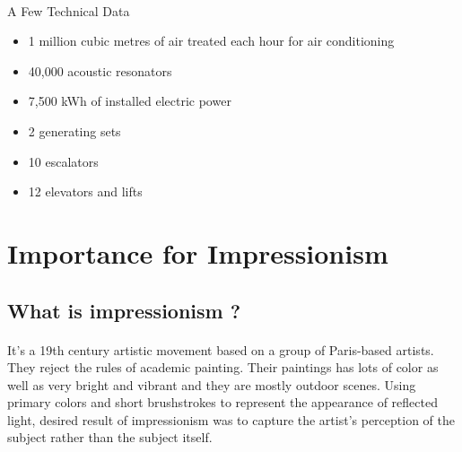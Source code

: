 \documentclass[
10pt, %
a4paper, %
oneside, %
headinclude,footinclude, %
BCOR5mm, %
]{scrartcl}
\theoremstyle{definition} %
\theoremstyle{plain} %
\theoremstyle{remark} %
\begin{document}
\paragraph{}A Few Technical Data
\begin{itemize}
	\item 1 million cubic metres of air treated each hour for air conditioning
	\item 40,000 acoustic resonators
	\item 7,500 kWh of installed electric power
	\item 2 generating sets
	\item 10 escalators
	\item 12 elevators and lifts
\end{itemize}






 

\section{Importance for Impressionism}

\subsection{What is impressionism ? }

\paragraph{}
It's a 19th century artistic movement based on a group of Paris-based artists. They reject the rules of academic painting. Their paintings has lots of color as well as very bright and vibrant and they are mostly outdoor scenes. Using primary colors and short brushstrokes to represent the appearance of reflected light, desired result of impressionism was to capture the artist's perception of the subject rather than the subject itself. 
\end{document}
